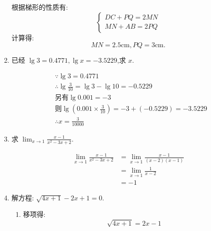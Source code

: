 \begin{questions}
\begin{enumerate}[label=(\arabic*)]
		      \begin{solution}
			      根据梯形的性质有:
			      \begin{equation*}
				      \begin{cases}
					      DC + PQ = 2MN \\
					      MN + AB = 2PQ
				      \end{cases}
			      \end{equation*}
			      计算得:
			      \begin{equation*}
				      MN = 2.5\text{cm}, PQ = 3\text{cm}.
			      \end{equation*}
		      \end{solution}
		\item 已经 \( \lg3=0.4771, \lg{x}=-3.5229 \),求 \( x \).
		      \begin{solution}
			      \begin{align*}
				       & \because \lg3                              = 0.4771                  \\
				       & \therefore \lg{\frac{3}{10}}               = \lg3 - \lg10 = -0.5229  \\
				       & \text{另有} \lg0.001                       = -3                        \\
				       & \text{则} \lg(0.001 \times \frac{3}{10} )  = -3 + (-0.5229) = -3.5229 \\
				       & \therefore x = \frac{3}{10000}
			      \end{align*}
		      \end{solution}
		\item 求 \(\displaystyle \lim_{x\to1}\frac{x-1}{x^2-3x+2} \).
		      \begin{solution}
			      \begin{align*}
				      \lim_{x\to1}\frac{x-1}{x^2 - 3x + 2} & = \lim_{x\to1}\frac{x-1}{(x-2)(x-1)} \\
				                                           & = \lim_{x\to1}\frac{1}{x-2}          \\
				                                           & = -1
			      \end{align*}
		      \end{solution}
		\item 解方程: \( \sqrt{4x+1} - 2x + 1 = 0 \).
		      \begin{solution}
			      \begin{enumerate}[label=\protect\circled{\arabic*}]
				      \item 移项得:
				            \begin{equation*}
					            \sqrt{4x+1} = 2x - 1
				            \end{equation*}


\end{enumerate}
\end{solution}
\end{enumerate}
\end{questions}
